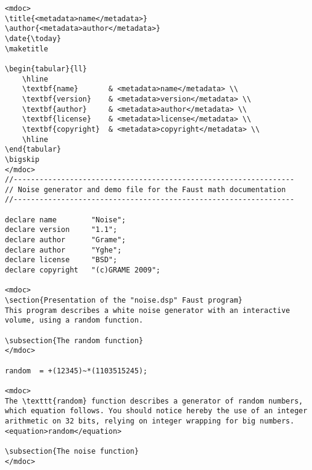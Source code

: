 \footnotesize
\begin{lstlisting}
<mdoc>
\title{<metadata>name</metadata>}
\author{<metadata>author</metadata>}
\date{\today}
\maketitle

\begin{tabular}{ll}
	\hline
	\textbf{name}		& <metadata>name</metadata> \\
	\textbf{version} 	& <metadata>version</metadata> \\
	\textbf{author} 	& <metadata>author</metadata> \\
	\textbf{license} 	& <metadata>license</metadata> \\
	\textbf{copyright} 	& <metadata>copyright</metadata> \\
	\hline
\end{tabular}
\bigskip
</mdoc>
//-----------------------------------------------------------------
// Noise generator and demo file for the Faust math documentation
//-----------------------------------------------------------------

declare name 		"Noise";
declare version 	"1.1";
declare author 		"Grame";
declare author 		"Yghe";
declare license 	"BSD";
declare copyright 	"(c)GRAME 2009";

<mdoc>
\section{Presentation of the "noise.dsp" Faust program}
This program describes a white noise generator with an interactive volume, using a random function.

\subsection{The random function}
</mdoc>

random  = +(12345)~*(1103515245);

<mdoc>
The \texttt{random} function describes a generator of random numbers, which equation follows. You should notice hereby the use of an integer arithmetic on 32 bits, relying on integer wrapping for big numbers.
<equation>random</equation>

\subsection{The noise function}
</mdoc>


\end{lstlisting}
